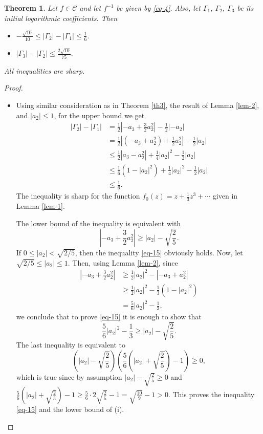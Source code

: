 \documentclass{amsart}
\newtheorem{thm}{Theorem}
\begin{document}
\medskip

\begin{thm}\label{th4}
Let $f\in\mathcal{C}$ and let  $f^{-1}$  be given by \eqref{eq-4}. Also, let $\Gamma_{1}$, $\Gamma_{2}$, $\Gamma _{3}$
be its initial logarithmic coefficients. Then
\begin{itemize}
  \item[($i$)] $-\frac{\sqrt{10}}{10}\leq |\Gamma_{2}|-|\Gamma_{1}|\leq \frac{1}{6}.$
\item[($ii$)]  $|\Gamma_{3}|-|\Gamma_{2}|\leq\frac{2\sqrt{10}}{75}.$
\end{itemize}
All inequalities are sharp.
\end{thm}

\medskip

\begin{proof} $ $
\begin{itemize}
  \item[(i)]  Using similar consideration as in Theorem \ref{th3}, the result of Lemma \ref{lem-2}, and $|a_{2}|\leq1$, for the upper bound we get
\[
\begin{split}
|\Gamma_{2}|-|\Gamma_{1}|&=\frac{1}{2}\left|-a_{3}+\frac{3}{2}a_{2}^{2}\right|-\frac{1}{2}|-a_{2}|\\
&=\frac{1}{2}\left|(-a_{3}+a_{2}^{2})+\frac{1}{2}a_{2}^{2}\right|-\frac{1}{2}|a_{2}|\\
&\leq\frac{1}{2}|a_{3}-a_{2}^{2}|+ \frac{1}{4}|a_{2}|^{2}-\frac{1}{2}|a_{2}|\\
&\leq \frac{1}{6}(1-|a_{2}|^{2})+\frac{1}{4}|a_{2}|^{2}-\frac{1}{2}|a_{2}|\\
&\leq\frac{1}{6}.
\end{split}
\]
The inequality is sharp for the function $f_{0}(z)=z+\frac{1}{3}z^{3}+\cdots$ given in Lemma \ref{lem-1}.

\medskip

The lower bound of the inequality is equivalent with
\begin{equation}\label{eq-15}
\left|-a_{3}+\frac{3}{2}a_{2}^{2}\right|\geq|a_{2}|-\sqrt{\frac{2}{5}}.
\end{equation}
If $0\leq |a_{2}|<\sqrt{2/5}$, then the inequality \eqref{eq-15} obviously holds.
Now, let $\sqrt{2/5}\leq |a_{2}|\leq1$. Then, using Lemma \ref{lem-2}, since
\[
\begin{split}
\left|-a_{3}+\frac{3}{2}a_{2}^{2}\right| &\geq \frac{1}{2}|a_{2}|^{2}-|-a_{3}+a_{2}^{2}| \\
&\geq \frac{1}{2}|a_{2}|^{2}-\frac{1}{3}(1-|a_{2}|^{2})\\
&=\frac{5}{6}|a_{2}|^{2}-\frac{1}{3},
\end{split}
\]
we conclude that to prove \eqref{eq-15} it is enough to show that
$$ \frac{5}{6}|a_{2}|^{2}-\frac{1}{3}\geq |a_{2}|-\sqrt{\frac{2}{5}}.$$
The last inequality is equivalent to
$$ \left(|a_{2}|-\sqrt{\frac{2}{5}}\right)\left(\frac{5}{6}\left(|a_{2}|+\sqrt{\frac{2}{5}}\right)-1\right)\geq0,$$
which is true since by assumption $|a_{2}| -\sqrt{\frac{2}{5}}\geq 0$  and
$\frac{5}{6}\left(|a_{2}|+\sqrt{\frac{2}{5}}\right)-1\geq \frac{5}{6}\cdot2\sqrt{\frac{2}{5}}-1=\sqrt{\frac{10}{9}}-1>0$. This proves the inequality \eqref{eq-15} and the lower bound of (i).


\end{itemize}
\end{proof}
\end{document}
